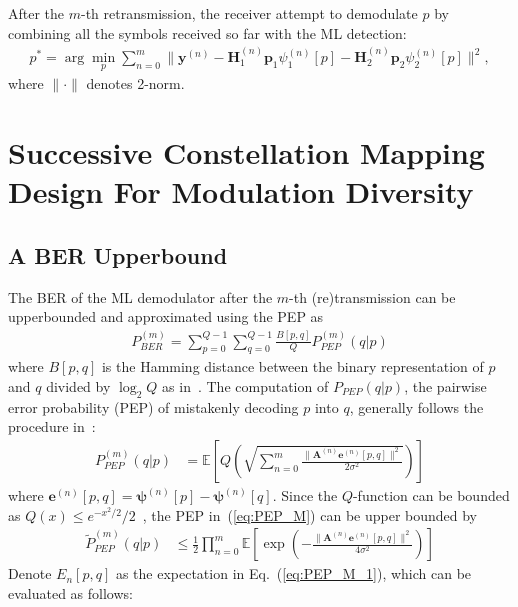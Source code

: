 \documentclass[journal,draftcls,onecolumn,12pt,twoside]{IEEEtran}
\begin{document}
After the $m$-th retransmission, the receiver attempt to
demodulate $p$ by combining all the symbols received so far with the ML
detection:
\begin{align}
    p^* = \arg\min_p\sum_{n = 0}^{m}\|\mathbf{y}^{(n)} -
    \mathbf{H}_1^{(n)}\mathbf{p}_1\psi_1^{(n)}[p] -
    \mathbf{H}_2^{(n)}\mathbf{p}_2\psi_2^{(n)}[p]\|^2,
\end{align}
where $\|\cdot\|$ denotes 2-norm.

\section{Successive Constellation Mapping Design For Modulation Diversity}
\label{sec:modiv}

\subsection{A BER Upperbound}
\label{ssec:ber}
The BER of the ML demodulator after the $m$-th (re)transmission can be
upperbounded and approximated using the PEP as
\begin{align}
  P_{BER}^{(m)} = \sum_{p=0}^{Q - 1}\sum_{q=0}^{Q - 1}\frac{B[p,
  q]}{Q}P_{PEP}^{(m)}(q|p) \label{eq:P_BER}
\end{align}
where $B[p, q]$ is the Hamming distance between the binary
representation of $p$ and $q$ divided by $\log_2Q$ as
in~\cite{samra2005symbol}. The computation of $P_{PEP}(q|p)$, the pairwise
error probability (PEP) of mistakenly decoding $p$ into $q$, generally follows
the procedure in~\cite{han2009performance}:
\begin{align}
    P_{PEP}^{(m)}(q|p) & = \mathbb{E}
    \left[Q\left(\sqrt{\sum_{n=0}^m\frac{\|\mathbf{A}^{(n)}
    \mathbf{e}^{(n)}[p,q]\|^2} {2\sigma^2}}\right)\right]
    \label{eq:PEP_M}
\end{align}
where $\mathbf{e}^{(n)}[p,q] = \bm{\psi}^{(n)}[p] - \bm{\psi}^{(n)}[q]$. Since the
$Q$-function can be bounded as $Q(x)\leq e^{-x^2/2}/2$~\cite{proakisdigital},
the PEP in~(\ref{eq:PEP_M}) can be upper bounded by
\begin{align}
    \tilde{P}_{PEP}^{(m)}(q|p) &\leq
    \frac{1}{2} \prod_{n=0}^{m}
    \mathbb{E}\left[\exp\left(-\frac{\|\mathbf{A}^{(n)}
    \mathbf{e}^{(n)}[p,q]\|^2}{4\sigma^2}\right)\right]
    \label{eq:PEP_M_1}
\end{align}
Denote $E_n[p,q]$ as the expectation in Eq.~(\ref{eq:PEP_M_1}), which can be
evaluated as follows:
\end{document}
